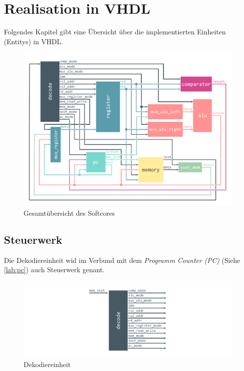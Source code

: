 \chapter{Realisation in VHDL}

    Folgendes Kapitel gibt eine Übersicht über die implementierten Einheiten (Entitys) in VHDL.
    \begin{figure}[H]
        \centering
        \includegraphics[scale=1]{img/OverviewCPU.pdf}
        \caption{Gesamtübersicht des Softcores}
        \label{fig:cpu_overview}
    \end{figure}


    \section{Steuerwerk}

        Die Dekodiereinheit wid im Verbund mit dem \textit{Programm Counter (PC)} (Siehe \ref{lab:pc}) auch Steuerwerk genant.

        \begin{figure}[H]
            \centering
            \includegraphics[scale=1]{img/block_decode.pdf}
            \caption{Dekodiereinheit}
            \label{fig:decode}
        \end{figure}

